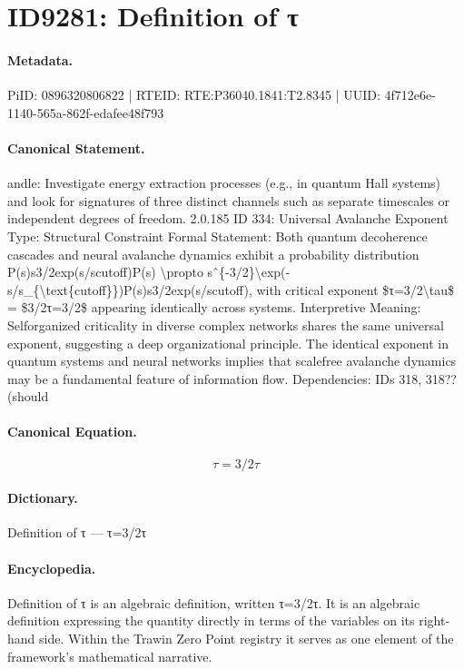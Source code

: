 \section*{ID9281: Definition of τ}
\paragraph{Metadata.}
PiID: 0896320806822 | RTEID: RTE:P36040.1841:T2.8345 | UUID: 4f712e6e-1140-565a-862f-edafee48f793

\paragraph{Canonical Statement.}
andle: Investigate energy extraction processes (e.g., in quantum Hall systems) and look for signatures of three distinct channels such as separate timescales or independent degrees of freedom. 2.0.185 ID 334: Universal Avalanche Exponent Type: Structural Constraint Formal Statement: Both quantum decoherence cascades and neural avalanche dynamics exhibit a probability distribution P(s)s3/2exp(s/scutoff)P(s) \textbackslash{}propto sˆ\{-3/2\}\textbackslash{}exp(-s/s\_\{\textbackslash{}text\{cutoff\}\})P(s)s3/2exp(s/scutoff), with critical exponent \$τ=3/2\textbackslash{}tau\$ = \$3/2τ=3/2\$ appearing identically across systems. Interpretive Meaning: Selforganized criticality in diverse complex networks shares the same universal exponent, suggesting a deep organizational principle. The identical exponent in quantum systems and neural networks implies that scalefree avalanche dynamics may be a fundamental feature of information flow. Dependencies: IDs 318, 318?? (should

\paragraph{Canonical Equation.}
\[
τ=3/2\tau
\]

\paragraph{Dictionary.}
Definition of τ — τ=3/2τ

\paragraph{Encyclopedia.}
Definition of τ is an algebraic definition, written τ=3/2τ. It is an algebraic definition expressing the quantity directly in terms of the variables on its right-hand side. Within the Trawin Zero Point registry it serves as one element of the framework's mathematical narrative.
